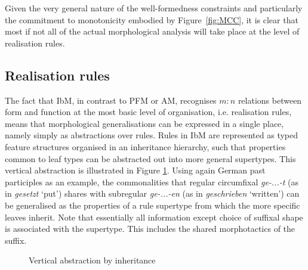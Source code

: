Given the very general nature of the well-formedness constraints and
particularly the commitment to monotonicity embodied by
Figure~\ref{fig:MCC}, it is clear that most if not all of the actual
morphological analysis will take place at the level of realisation
rules.


\subsection{Realisation rules}

The fact that IbM, in contrast to PFM or AM, recognises $m:n$
relations between form and function at the most basic level of
organisation, i.e. realisation rules, means that morphological
generalisations can be expressed in a single place, name\-ly simply as
abstractions over rules. Rules in IbM are represented as typed feature
structures organised in an inheritance hierarchy, such that properties
common to leaf types can be abstracted out into more general
supertypes. This vertical abstraction is illustrated in Figure
\ref{fig:Vertical}. Using again German past participles as an example,
the commonalities that regular circumfixal \textit{ge-...-t} (as in
\textit{gesetzt} `put') shares with subregular \textit{ge-...-en} (as
in \textit{geschrieben} `written') can be generalised as the
properties of a rule supertype from which the more specific leaves
inherit. Note that essentially all information except choice of
suffixal shape is associated with the supertype. This includes the
shared morphotactics of the suffix.

\begin{figure}
  \begin{center}
    \hspace*{-1em} 
    \begin{tree}
    \end{tree}
  \end{center}
  \caption{Vertical abstraction by inheritance}
  \label{fig:Vertical}
\end{figure}

